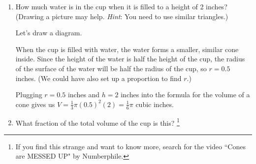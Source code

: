 \documentclass{article}
\begin{document}
\begin{enumerate}
    \begin{enumerate}
        \item 
        \begin{problem}
        How much water is in the cup when it is filled to a height of 2 inches? (Drawing a picture may help. \emph{Hint}: You need to use similar triangles.)
        \end{problem}
        \pspace{\vfill}

        \begin{solution}
            Let's draw a diagram.
            \begin{center}
      \end{center}    
      When the cup is filled with water, the water forms a smaller, similar cone inside. Since the height of the water is half the height of the cup, the radius of the surface of the water will be half the radius of the cup, so $r=0.5$ inches. (We could have also set up a proportion to find $r$.)

      Plugging $r=0.5$ inches and $h=2$ inches into the formula for the volume of a cone gives us $V=\tfrac{1}{3}\pi(0.5)^2(2)=\frac{1}{6}\pi$ cubic inches.
        \end{solution}
        
        \item
        \begin{problem}
What fraction of the total volume of the cup is this?
    \footnote{If you find this strange and want to know more, search for the video ``Cones are MESSED UP" by Numberphile.}
    \end{problem}


\end{enumerate}
\end{enumerate}
\end{document}
